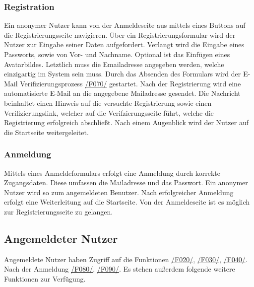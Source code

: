 \subsubsection{Registration}
\begin{description}
     Ein anonymer Nutzer kann von der Anmeldeseite aus mittels eines
    Buttons auf die Registrierungsseite navigieren.
     Über ein Registrierungsformular wird der Nutzer zur Eingabe seiner
    Daten aufgefordert. Verlangt wird die Eingabe eines Passworts, %
    sowie von Vor- und Nachname. Optional ist das Einfügen eines Avatarbildes. Letztlich muss die Emailadresse
    angegeben werden, welche einzigartig im System sein muss. Durch das Absenden des Formulars wird der E-Mail Verifizierungsprozess
    \hyperref[funkt:070]{/F070/} gestartet.
     Nach der Registrierung wird eine automatisierte E-Mail
    an die angegebene Mailadresse gesendet. Die Nachricht beinhaltet einen Hinweis auf
    die versuchte Registrierung sowie einen Verifizierungslink, welcher auf die Verifzierungsseite führt, welche
    die Registrierung erfolgreich abschließt. Nach einem Augenblick wird der Nutzer
    auf die Startseite weitergeleitet.
\end{description}

\subsubsection{Anmeldung}
\begin{description}
     Mittels eines Anmeldeformulars erfolgt eine Anmeldung durch korrekte Zugangsdaten.
    Diese umfassen die Mailadresse und das Passwort.
    Ein anonymer Nutzer wird so zum angemeldeten Benutzer.
    Nach erfolgreicher Anmeldung erfolgt eine Weiterleitung auf die Startseite.
     Von der Anmeldeseite ist es möglich zur Registrierungsseite zu gelangen.
\end{description}

\subsection{Angemeldeter Nutzer}
Angemeldete Nutzer haben Zugriff auf die Funktionen
\hyperref[funkt:020]{/F020/}, \hyperref[funkt:030]{/F030/}, \hyperref[funkt:040]{/F040/}.
Nach der Anmeldung \hyperref[funkt:080]{/F080/}, \hyperref[funkt:090]{/F090/}.
Es stehen außerdem folgende weitere Funktionen zur Verfügung.

